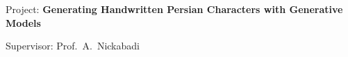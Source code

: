 \begin{cventries}
{\begin{cvitems}
{\begin{adjustwidth}{4mm}{}
\begin{tabular}{l@{\hskip 5mm}l@{\hskip 5mm}l}
            \end{tabular}
          	\medskip
          \end{adjustwidth}
        }
        \item{
          Project: \textbf{Generating Handwritten Persian Characters with Generative Models}
        }
        \item{
          Supervisor: Prof.~A.~Nickabadi
        }
      \end{cvitems}
    }


\end{cventries}
